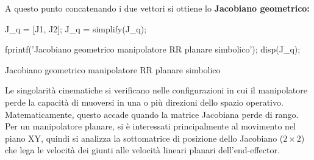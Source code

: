 \documentclass[11pt, a4paper]{article}
\begin{document}
\begin{par}
\begin{flushleft}
A questo punto concatenando i due vettori si ottiene lo \textbf{Jacobiano geometrico:}
\end{flushleft}
\end{par}

\begin{matlabcode}
J_q = [J1, J2];
J_q = simplify(J_q);

fprintf('Jacobiano geometrico manipolatore RR planare simbolico');
disp(J_q);
\end{matlabcode}
\begin{matlaboutput}
Jacobiano geometrico manipolatore RR planare simbolico
\end{matlaboutput}

\vspace{1em}

\begin{par}
\begin{flushleft}
Le singolarità cinematiche si verificano nelle configurazioni in cui il manipolatore perde la capacità di muoversi in una o più direzioni dello spazio operativo. Matematicamente, questo accade quando la matrice Jacobiana perde di rango. Per un manipolatore planare, si è interessati principalmente al movimento nel piano XY, quindi si analizza la sottomatrice di posizione dello Jacobiano ($2\times 2$) che lega le velocità dei giunti alle velocità lineari planari dell'end-effector.
\end{flushleft}
\end{par}
\end{document}
